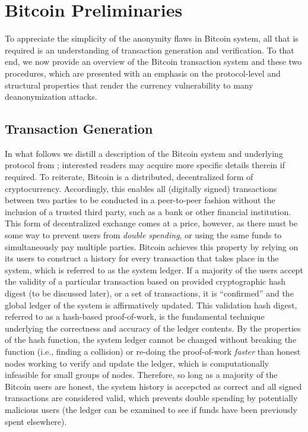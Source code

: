 \section{Bitcoin Preliminaries} \label{sec:preliminaries}

To appreciate the simplicity of the anonymity flaws in Bitcoin system, all that is required is an understanding of transaction generation and verification. To that end, we now provide an overview of the Bitcoin transaction system and these two procedures, which are presented with an emphasis on the protocol-level and structural properties that render the currency vulnerability to many deanonymization attacks.

\subsection{Transaction Generation}

In what follows we distill a description of the Bitcoin system and underlying protocol from \cite{bitcoin}; interested readers may acquire more specific details therein if required. To reiterate, Bitcoin is a distributed, decentralized form of cryptocurrency. Accordingly, this enables all (digitally signed) transactions between two parties to be conducted in a peer-to-peer fashion without the inclusion of a trusted third party, such as a bank or other financial institution. This form of decentralized exchange comes at a price, however, as there must be some way to prevent users from \emph{double spending}, or using the same funds to simultaneously pay multiple parties. Bitcoin achieves this property by relying on its users to construct a history for every transaction that takes place in the system, which is referred to as the system ledger. If a majority of the users accept the validity of a particular transaction based on provided cryptographic hash digest (to be discussed later), or a set of transactions, it is ``confirmed'' and the global ledger of the system is affirmatively updated. This validation hash digest, referred to as a hash-based proof-of-work, is the fundamental technique underlying the correctness and accuracy of the ledger contents. By the properties of the hash function, the system ledger cannot be changed without breaking the function (i.e., finding a collision) or re-doing the proof-of-work \emph{faster} than honest nodes working to verify and update the ledger, which is computationally infeasible for small groups of nodes. Therefore, so long as a majority of the Bitcoin users are honest, the system history is accepcted as correct and all signed transactions are considered valid, which prevents double spending by potentially malicious users (the ledger can be examined to see if funds have been previously spent elsewhere). 

